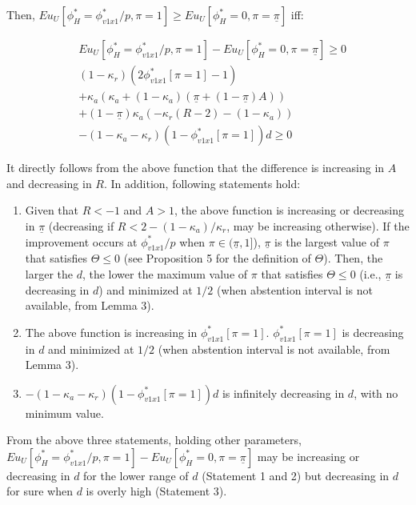\par Then, $Eu_U[\phi^*_H = \phi^*_{v1x1}/p, \pi=1] \geq Eu_U[\phi^*_H=0,\pi=\underline{\pi}]$ iff: 

\begin{align*}
	&Eu_U[\phi^*_H = \phi^*_{v1x1}/p, \pi=1] - Eu_U[\phi^*_H=0,\pi=\underline{\pi}] \geq 0 \\
	&(1-\kappa_r)(2\phi^*_{v1x1}[\pi=1]-1)\\
	&+\kappa_a(\kappa_a + (1-\kappa_a)(\underline{\pi} + (1-\underline{\pi})A)) \\
	&+(1-\underline{\pi}) \kappa_a (-\kappa_r(R-2)-(1-\kappa_a))\\
	&-(1-\kappa_a-\kappa_r)(1-\phi^*_{v1x1}[\pi=1])d \geq 0
\end{align*}

\par It directly follows from the above function that the difference is increasing in $A$ and decreasing in $R$. In addition, following statements hold:

\begin{enumerate}
	\item Given that $R<-1$ and $A>1$, the above function is increasing or decreasing in $\underline{\pi}$ (decreasing if $R < 2 - (1-\kappa_a)/\kappa_r$, may be increasing otherwise). If the improvement occurs at $\phi^*_{v1x1}/p$ when $\pi \in (\underline{\pi},1]$), $\underline{\pi}$ is the largest value of $\pi$ that satisfies $\Theta\leq0$ (see Proposition 5 for the definition of $\Theta$). Then, the larger the $d$, the lower the maximum value of $\pi$ that satisfies $\Theta\leq0$ (i.e., $\underline{\pi}$ is decreasing in $d$) and minimized at $1/2$ (when abstention interval is not available, from Lemma 3). 
	\item The above function is increasing in $\phi^*_{v1x1}[\pi=1]$. $\phi^*_{v1x1}[\pi=1]$ is decreasing in $d$ and minimized at $1/2$ (when abstention interval is not available, from Lemma 3). 
	\item $-(1-\kappa_a-\kappa_r)(1-\phi^*_{v1x1}[\pi=1])d$ is infinitely decreasing in $d$, with no minimum value. 
\end{enumerate}

\noindent From the above three statements, holding other parameters, $Eu_U[\phi^*_H = \phi^*_{v1x1}/p, \pi=1] - Eu_U[\phi^*_H=0,\pi=\underline{\pi}]$ may be increasing or decreasing in $d$ for the lower range of $d$ (Statement 1 and 2) but decreasing in $d$ for sure when $d$ is overly high (Statement 3). 
 
